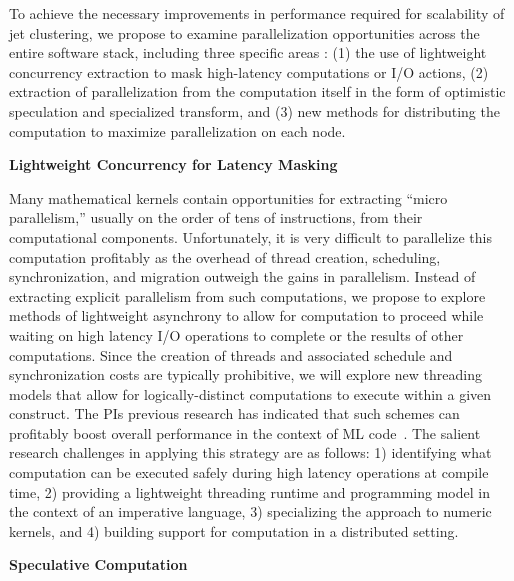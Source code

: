 \documentclass[times,11pt]{article}
\begin{document}
To achieve the necessary improvements in performance required for scalability
of jet clustering, we propose to examine parallelization opportunities across
the entire software stack, including three specific areas : 
(1) the use of lightweight concurrency
extraction to mask high-latency computations or I/O actions, 
(2) extraction of
parallelization from the computation itself in the form of optimistic speculation
and specialized transform, and
(3) new methods for distributing the computation to
maximize parallelization on each node. 


\bigskip
\noindent
{\bf  Lightweight Concurrency for Latency Masking}
\bigskip

Many mathematical kernels contain opportunities for extracting ``micro parallelism,''
usually on the order of tens of instructions, from their computational components. 
Unfortunately, it is very difficult to parallelize this computation profitably as
the overhead of thread creation, scheduling, synchronization, and migration outweigh
the gains in parallelism. Instead of extracting explicit parallelism from such
computations, we propose to explore methods of lightweight asynchrony to allow for
computation to proceed while waiting on high latency I/O operations to complete or
the results of other computations. Since the creation of threads and associated
schedule and synchronization costs are typically prohibitive, we will explore new
threading models that allow for logically-distinct computations to execute within
a given construct. The PIs previous research has indicated that such schemes can profitably
boost overall performance in the context of ML code~\cite{acml, parasites}. 
The salient research
challenges in applying this strategy are as follows:  1) identifying what computation can be executed
safely during high latency operations at compile time, 2) providing a lightweight threading runtime
and programming model in the context of an imperative language, 
3) specializing the approach to numeric kernels,
and 4) building support for computation in a distributed setting.

\bigskip
\noindent
{\bf Speculative Computation}
\bigskip
\end{document}
